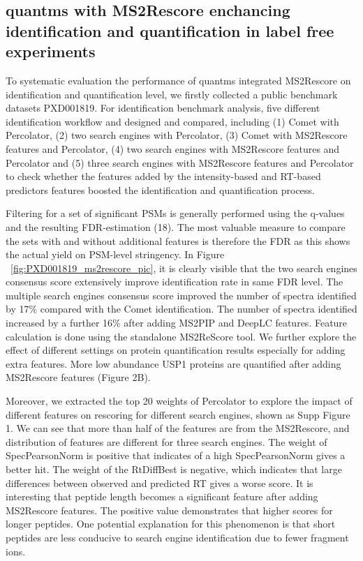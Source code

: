 \documentclass[12pt]{article}
\begin{document}
\subsection{quantms with MS2Rescore enchancing identification and quantification in label free experiments}
To systematic evaluation the performance of quantms integrated MS2Rescore on identification and quantification level,  we firstly collected a public benchmark datasets PXD001819. For identification benchmark analysis, five different identification workflow and designed and compared, including (1) Comet with Percolator, (2) two search engines with Percolator, (3) Comet with MS2Rescore features and Percolator, (4) two search engines with MS2Rescore features and Percolator and (5) three search engines with MS2Rescore features and Percolator to check whether the features added by the intensity-based and RT-based predictors features boosted the identification and quantification process.

Filtering for a set of significant PSMs is generally performed using the q-values and the resulting FDR-estimation (18). The most valuable measure to compare the sets with and without additional features is therefore the FDR as this shows the actual yield on PSM-level stringency. In Figure ~\ref{fig:PXD001819_ms2rescore_pic}, it is clearly visible that the 
two search engines consensus score extensively improve identification rate in same FDR level. The multiple search engines consensus score improved the number of spectra identified by 17\% compared with the Comet identification. The number of spectra identified increased by a further 16\% after adding MS2PIP and DeepLC features. Feature calculation is done using the standalone MS2ReScore tool. We further explore the effect of different settings on protein quantification results especially for adding extra features. More low abundance USP1 proteins are quantified after adding MS2Rescore features (Figure 2B).

Moreover, we extracted the top 20 weights of Percolator to explore the impact of different features on rescoring for different search engines, shown as Supp Figure 1. We can see that more than half of the features are from the MS2Rescore, and distribution of features are different for three search engines. The weight of SpecPearsonNorm is positive that indicates of a high SpecPearsonNorm gives a better hit. The weight of the RtDiffBest is negative, which indicates that large differences between observed and predicted RT gives a worse score. It is interesting that peptide length becomes a significant feature after adding MS2Rescore features. The positive value demonstrates that higher scores for longer peptides. One potential explanation for this phenomenon is that short peptides are less conducive to search engine identification due to fewer fragment ions. 
\end{document}
